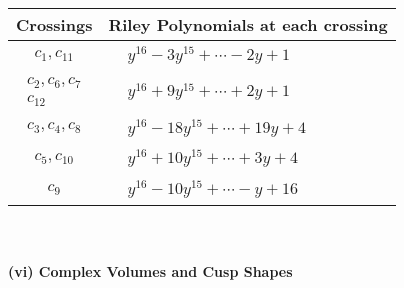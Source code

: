 \documentclass[1p]{elsarticle_modified}
\theoremstyle{definition}
\begin{document}
\begin{tabular}{m{50pt}|m{274pt}}
Crossings & \hspace{64pt}Riley Polynomials at each crossing \\
\hline $$\begin{aligned}c_{1},c_{11}\end{aligned}$$&$\begin{aligned}
&y^{16}-3 y^{15}+\cdots-2 y+1
\end{aligned}$\\
\hline $$\begin{aligned}c_{2},c_{6},c_{7}\\c_{12}\end{aligned}$$&$\begin{aligned}
&y^{16}+9 y^{15}+\cdots+2 y+1
\end{aligned}$\\
\hline $$\begin{aligned}c_{3},c_{4},c_{8}\end{aligned}$$&$\begin{aligned}
&y^{16}-18 y^{15}+\cdots+19 y+4
\end{aligned}$\\
\hline $$\begin{aligned}c_{5},c_{10}\end{aligned}$$&$\begin{aligned}
&y^{16}+10 y^{15}+\cdots+3 y+4
\end{aligned}$\\
\hline $$\begin{aligned}c_{9}\end{aligned}$$&$\begin{aligned}
&y^{16}-10 y^{15}+\cdots- y+16
\end{aligned}$\\
\hline
\end{tabular}\\~\\
\newpage\flushleft \textbf{(vi) Complex Volumes and Cusp Shapes}
\end{document}
